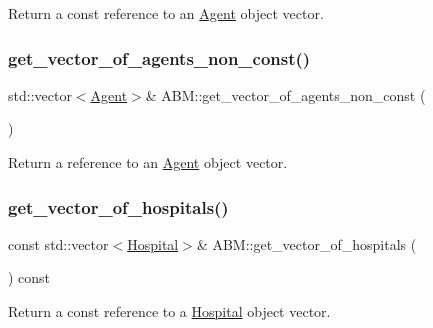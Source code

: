 Return a const reference to an \hyperlink{classAgent}{Agent} object vector. 

\mbox{\label{classABM_a5a58ed2717810317bc8fe8df841dcf08}} 
\subsubsection{\texorpdfstring{get\+\_\+vector\+\_\+of\+\_\+agents\+\_\+non\+\_\+const()}{get\_vector\_of\_agents\_non\_const()}}
{\footnotesize\ttfamily std\+::vector$<$\hyperlink{classAgent}{Agent}$>$\& A\+B\+M\+::get\+\_\+vector\+\_\+of\+\_\+agents\+\_\+non\+\_\+const (\begin{DoxyParamCaption}{ }\end{DoxyParamCaption})\hspace{0.3cm}{\ttfamily [inline]}}



Return a reference to an \hyperlink{classAgent}{Agent} object vector. 

\mbox{\label{classABM_a16e9e7297235fa57b1b65b9340af49ad}} 
\subsubsection{\texorpdfstring{get\+\_\+vector\+\_\+of\+\_\+hospitals()}{get\_vector\_of\_hospitals()}}
{\footnotesize\ttfamily const std\+::vector$<$\hyperlink{classHospital}{Hospital}$>$\& A\+B\+M\+::get\+\_\+vector\+\_\+of\+\_\+hospitals (\begin{DoxyParamCaption}{ }\end{DoxyParamCaption}) const\hspace{0.3cm}{\ttfamily [inline]}}



Return a const reference to a \hyperlink{classHospital}{Hospital} object vector. 

\mbox{\label{classABM_aa5cb222cd922ca221e063a840dc52aa1}} 

